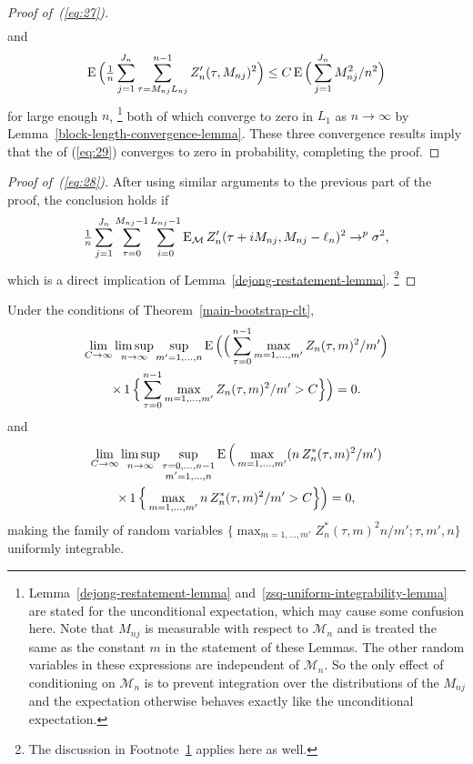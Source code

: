 \documentclass[11pt]{article}
\begin{document}
\begin{proof}[Proof of~(\ref{eq:27})]
\begin{align*}
  \end{align*}
  and
  \begin{equation*}
    \operatorname{E} \Big(\tfrac{1}{n} \sum_{j=1}^{J_n} \sum_{\tau= M_{nj}L_{nj}}^{n-1} Z_{n}'(\tau, M_{nj})^2\Big)
    \leq
    C \operatorname{E} \Big(\sum_{j=1}^{J_n} M_{nj}^2 / n^2 \Big)
  \end{equation*}
  for large enough $n$,%
\footnote{Lemma~\ref{dejong-restatement-lemma}
  and~\ref{zsq-uniform-integrability-lemma} are stated for the
  unconditional expectation, which may cause some confusion here. Note
  that $M_{nj}$ is measurable with respect to $\mathcal{M}_n$ and
  is treated the same as the constant $m$ in the statement of
  these Lemmas.  The other random variables in
  these expressions are independent of $\mathcal{M}_n$. So the only
  effect of conditioning on $\mathcal{M}_n$ is to prevent integration
  over the distributions of the $M_{nj}$ and the expectation otherwise
  behaves exactly like the unconditional expectation.\label{f:1}} %
  both of which converge to zero in $L_1$ as $n \to \infty$ by
  Lemma~\ref{block-length-convergence-lemma}.  These three convergence
  results imply that the  of (\ref{eq:29}) converges to
  zero in probability, completing the proof.
\end{proof}

\begin{proof}[Proof of~(\ref{eq:28})]
  After using similar arguments to the previous part of the proof,
  the conclusion holds if
  \begin{equation*}
    \tfrac{1}{n} \sum_{j=1}^{J_n} \sum_{\tau=0}^{M_{nj}-1} \sum_{i=0}^{L_{nj} - 1}
    \operatorname{E}_{\mathcal{M}} Z_n'(\tau + i M_{nj}, M_{nj} - \ell_n)^2 \to^p \sigma^2,
  \end{equation*}
  which is a direct implication of
  Lemma~\ref{dejong-restatement-lemma}.%
  \footnote{The discussion in Footnote~\ref{f:1} applies here as well.}
\end{proof}

\begin{lem}\label{bootstrapped-zsq-uniform-integrability-lemma}
  Under the conditions of Theorem~\ref{main-bootstrap-clt},
  \begin{multline}\label{eq:35}
    \lim_{C \to \infty} \limsup_{n \to \infty} \sup_{m' = 1,\dots,n}
    \operatorname{E}\Big(\Big(\sum_{\tau=0}^{n-1} \max_{m=1,\dots,m'} Z_n(\tau, m)^2 / m'\Big) \\
    \times\operatorname{1}\Big\{\sum_{\tau=0}^{n-1} \max_{m=1,\dots,m'} Z_n(\tau, m)^2 / m' > C\Big\}\Big) = 0.
  \end{multline}
  and
  \begin{multline}\label{eq:30}
    \lim_{C \to \infty} \limsup_{n \to \infty} \sup_{\substack{\tau = 0,\dots,n-1 \\ m'=1,\dots,n}}
    \operatorname{E}\Big(\max_{m = 1,\dots,m'} (n \, Z^*_n(\tau, m)^2 / m') \\
    \times \operatorname{1}\Big\{\max_{m = 1,\dots,m'} n \, Z^*_n(\tau, m)^2 / m' > C\Big\}\Big)
    = 0,
  \end{multline}
  making the family of random variables $\{\max_{m=1,\dots,m'}
  Z^{*}_n(\tau, m)^2 n / m'; \tau, m', n\}$ uniformly integrable.
\end{lem}
\end{document}
